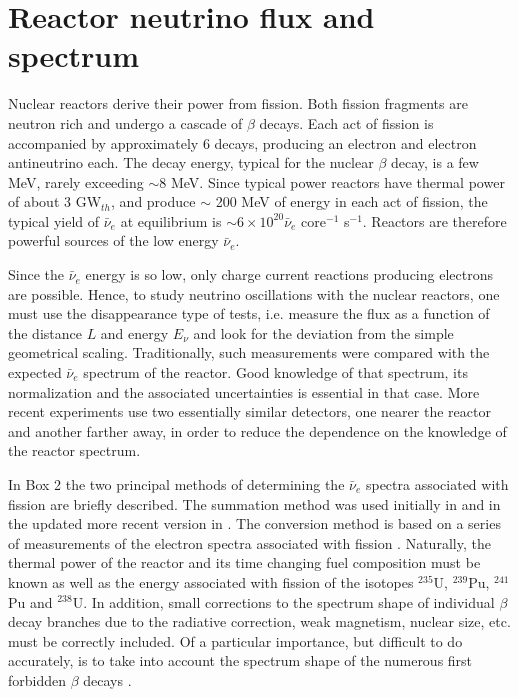 \section{Reactor neutrino flux and spectrum} 
\label{sec:flux}

Nuclear reactors derive their power from fission. Both fission fragments are neutron rich and undergo a cascade of $\beta$ decays. Each act of fission
is accompanied by approximately 6 decays, producing an electron and electron antineutrino each. The decay energy, typical for the nuclear
$\beta$ decay, is a few MeV, rarely exceeding $\sim$8 MeV. Since typical power reactors have thermal power of about 3 GW$_{th}$, and produce
$\sim$ 200 MeV of energy in each act of fission, the typical yield of $\bar{\nu}_e$ at equilibrium is $\sim 6 \times 10^{20} \bar{\nu}_e$ core$^{-1}$ s$^{-1}$.   
Reactors are therefore powerful sources of the low energy $\bar{\nu}_e$.

Since the $\bar{\nu}_e$ energy is so low, only charge current reactions producing electrons are possible. Hence, to study neutrino oscillations with
the nuclear reactors, one must use the disappearance type of tests, i.e. measure the flux as a function of the distance $L$ and energy $E_{\nu}$ and
look for the deviation from the simple geometrical scaling. Traditionally, such measurements were compared with the expected  $\bar{\nu}_e$ spectrum
of the reactor. Good knowledge of that spectrum, its normalization and the associated uncertainties is essential in that case.  More recent experiments
\cite{Dayabay,Reno} use two essentially similar detectors, one nearer the reactor and another farther away, in order to reduce the dependence on the
knowledge of the reactor spectrum.

In Box 2 the two principal methods of determining the $\bar{\nu}_e$ spectra associated with fission are briefly described. The summation method was used
initially in \cite{Davis,Vogel81,Klapdor-Pu,Klapdor-U,Kopeikin} and in the updated more recent version in \cite{Mueller, Huber}. The conversion method is based on a series
of measurements of the electron spectra associated with fission \cite{vonFeilitzsch,Schreckenbach,Hahn,Haag}. Naturally, the thermal power of the reactor
and its time changing fuel composition must be known as well as the energy associated with fission of the isotopes $^{235}$U, $^{239}$Pu, $^{241}$Pu
and $^{238}$U. In addition, small corrections to the spectrum shape of individual $\beta$ decay branches due to the radiative correction, weak magnetism,
nuclear size,
etc. must be correctly included. Of a particular importance, but difficult to do accurately, is to take into account the spectrum shape of the numerous
first forbidden $\beta$ decays \cite{Hayes}.


